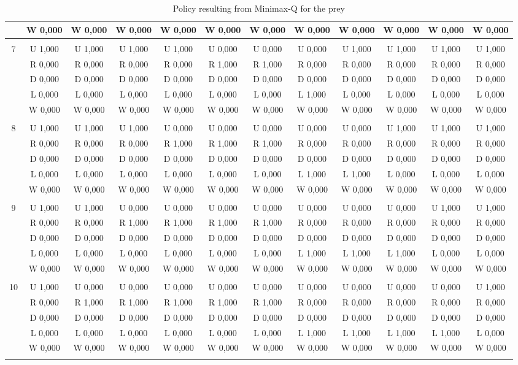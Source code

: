\begin{table}[htbp]
\begin{tiny}
\begin{tabular}{c|c|c|c|c|c|c|c|c|c|c|c|}
&W 0,000&W 0,000&W 0,000&W 0,000&W 0,000&W 0,000&W 0,000&W 0,000&W 0,000&W 0,000&W 0,000\\
\hline \\
7&U 1,000&U 1,000&U 1,000&U 1,000&U 0,000&U 0,000&U 0,000&U 1,000&U 1,000&U 1,000&U 1,000\\
&R 0,000&R 0,000&R 0,000&R 0,000&R 1,000&R 1,000&R 0,000&R 0,000&R 0,000&R 0,000&R 0,000\\
&D 0,000&D 0,000&D 0,000&D 0,000&D 0,000&D 0,000&D 0,000&D 0,000&D 0,000&D 0,000&D 0,000\\
&L 0,000&L 0,000&L 0,000&L 0,000&L 0,000&L 0,000&L 1,000&L 0,000&L 0,000&L 0,000&L 0,000\\
&W 0,000&W 0,000&W 0,000&W 0,000&W 0,000&W 0,000&W 0,000&W 0,000&W 0,000&W 0,000&W 0,000\\
\hline \\
8&U 1,000&U 1,000&U 1,000&U 0,000&U 0,000&U 0,000&U 0,000&U 0,000&U 1,000&U 1,000&U 1,000\\
&R 0,000&R 0,000&R 0,000&R 1,000&R 1,000&R 1,000&R 0,000&R 0,000&R 0,000&R 0,000&R 0,000\\
&D 0,000&D 0,000&D 0,000&D 0,000&D 0,000&D 0,000&D 0,000&D 0,000&D 0,000&D 0,000&D 0,000\\
&L 0,000&L 0,000&L 0,000&L 0,000&L 0,000&L 0,000&L 1,000&L 1,000&L 0,000&L 0,000&L 0,000\\
&W 0,000&W 0,000&W 0,000&W 0,000&W 0,000&W 0,000&W 0,000&W 0,000&W 0,000&W 0,000&W 0,000\\
\hline \\
9&U 1,000&U 1,000&U 0,000&U 0,000&U 0,000&U 0,000&U 0,000&U 0,000&U 0,000&U 1,000&U 1,000\\
&R 0,000&R 0,000&R 1,000&R 1,000&R 1,000&R 1,000&R 0,000&R 0,000&R 0,000&R 0,000&R 0,000\\
&D 0,000&D 0,000&D 0,000&D 0,000&D 0,000&D 0,000&D 0,000&D 0,000&D 0,000&D 0,000&D 0,000\\
&L 0,000&L 0,000&L 0,000&L 0,000&L 0,000&L 0,000&L 1,000&L 1,000&L 1,000&L 0,000&L 0,000\\
&W 0,000&W 0,000&W 0,000&W 0,000&W 0,000&W 0,000&W 0,000&W 0,000&W 0,000&W 0,000&W 0,000\\
\hline \\
10&U 1,000&U 0,000&U 0,000&U 0,000&U 0,000&U 0,000&U 0,000&U 0,000&U 0,000&U 0,000&U 1,000\\
&R 0,000&R 1,000&R 1,000&R 1,000&R 1,000&R 1,000&R 0,000&R 0,000&R 0,000&R 0,000&R 0,000\\
&D 0,000&D 0,000&D 0,000&D 0,000&D 0,000&D 0,000&D 0,000&D 0,000&D 0,000&D 0,000&D 0,000\\
&L 0,000&L 0,000&L 0,000&L 0,000&L 0,000&L 0,000&L 1,000&L 1,000&L 1,000&L 1,000&L 0,000\\
&W 0,000&W 0,000&W 0,000&W 0,000&W 0,000&W 0,000&W 0,000&W 0,000&W 0,000&W 0,000&W 0,000\\
\hline \\
\end{tabular}
\end{tiny}
\caption{Policy resulting from Minimax-Q for the prey}
\end{table}